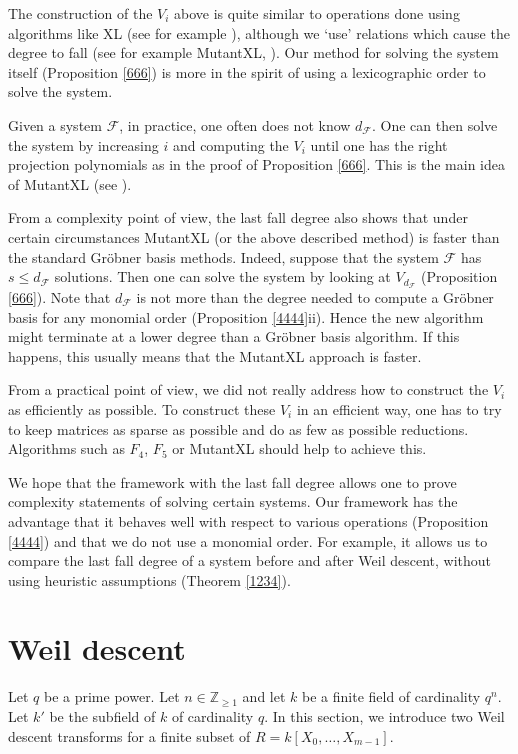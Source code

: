 \documentclass{amsart}
\theoremstyle{plain}
\theoremstyle{definition}
\begin{document}
The construction of the $V_i$ above is quite similar to operations done using algorithms like XL (see for example \cite{COU}), although we `use' relations which cause the degree to fall (see for example MutantXL, \cite{BUC}). Our method for solving the system itself (Proposition \ref{666}) is more in the spirit of using a lexicographic order to solve the system. 

Given a system $\mathcal{F}$, in practice, one often does not know $d_{\mathcal{F}}$. One can then solve the system by increasing $i$ and computing the $V_i$ until one has the right projection polynomials as in the proof of Proposition \ref{666}. This is the main idea of MutantXL (see \cite{BUC}).

From a complexity point of view, the last fall degree also shows that under certain circumstances MutantXL (or the above described method) is faster than the standard Gr\"obner basis methods. Indeed, suppose that the system $\mathcal{F}$ has $s \leq d_{\mathcal{F}}$ solutions. Then one can solve the system by looking at $V_{d_{\mathcal{F}}}$ (Proposition \ref{666}). Note that $d_{\mathcal{F}}$ is not more than the degree needed to compute a Gr\"obner basis for any monomial order (Proposition \ref{4444}ii). Hence the new algorithm might terminate at a lower degree than a Gr\"obner basis algorithm. If this happens, this usually means that the MutantXL approach is faster.

From a practical point of view, we did not really address how to construct the $V_i$ as efficiently as possible. To construct these $V_i$ in an efficient way, one has to try to keep matrices as sparse as possible and do as few as possible reductions. Algorithms such as $F_4$, $F_5$ \cite{FAU4, FAU5} or MutantXL \cite{BUC} should help to achieve this.

We hope that the framework with the last fall degree allows one to prove complexity statements of solving certain systems. Our framework has the advantage that it behaves well with respect to various operations (Proposition \ref{4444}) and that we do not use a monomial order.
For example, it allows us to compare the last fall degree of a system before and after Weil descent, without using heuristic assumptions (Theorem \ref{1234}).

\section{Weil descent} \label{302}

Let $q$ be a prime power. Let $n \in \mathbb{Z}_{\geq 1}$ and let $k$ be a finite field of cardinality $q^n$. Let $k'$ be the subfield of $k$ of cardinality $q$. In this section, we introduce two Weil descent transforms for a finite subset of $R=k[X_0,\ldots,X_{m-1}]$.
\end{document}
